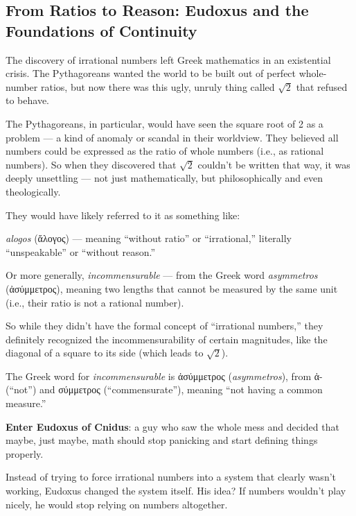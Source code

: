 \subsection{From Ratios to Reason: Eudoxus and the Foundations of Continuity}

The discovery of irrational numbers left Greek mathematics in an existential crisis. The Pythagoreans wanted the world to be built out of perfect whole-number ratios, but now there was this ugly, unruly thing called \( \sqrt{2} \) that refused to behave.

The Pythagoreans, in particular, would have seen the square root of 2 as a problem — a kind of anomaly or scandal in their worldview. They believed all numbers could be expressed as the ratio of whole numbers (i.e., as rational numbers). So when they discovered that \( \sqrt{2} \) couldn’t be written that way, it was deeply unsettling — not just mathematically, but philosophically and even theologically.

They would have likely referred to it as something like:

\textit{alogos} (\textgreek{ἄλογος}) — meaning ``without ratio'' or ``irrational,'' literally ``unspeakable'' or ``without reason.''

Or more generally, \textit{incommensurable} — from the Greek word \textit{asymmetros} (\textgreek{ἀσύμμετρος}), meaning two lengths that cannot be measured by the same unit (i.e., their ratio is not a rational number).

So while they didn't have the formal concept of ``irrational numbers,'' they definitely recognized the incommensurability of certain magnitudes, like the diagonal of a square to its side (which leads to \( \sqrt{2} \)).


The Greek word for \textit{incommensurable} is \textgreek{ἀσύμμετρος} (\textit{asymmetros}), 
from \textgreek{ἀ-} (``not'') and \textgreek{σύμμετρος} (``commensurate''), 
meaning ``not having a common measure.''

\textbf{Enter Eudoxus of Cnidus}: a guy who saw the whole mess and decided that maybe, just maybe, math should stop panicking and start defining things properly.

Instead of trying to force irrational numbers into a system that clearly wasn’t working, Eudoxus changed the system itself. His idea? If numbers wouldn’t play nicely, he would stop relying on numbers altogether.

